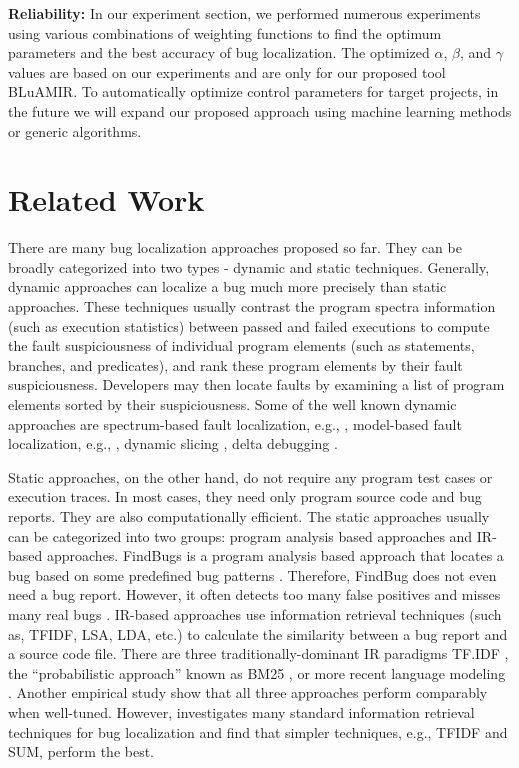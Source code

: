 \documentclass[conference]{IEEEtran}
\begin{document}
\textbf{Reliability:}
In our experiment section, we performed numerous experiments using various combinations of weighting functions to find the optimum parameters and the best accuracy of bug localization. The optimized $\alpha$, $\beta$, and $\gamma$ values are based on our experiments and are only for our proposed tool BLuAMIR. To automatically optimize control parameters for target projects, in the future we will expand our proposed approach using machine learning methods or generic algorithms.

\section{Related Work}\label{relatedwork}
There are many bug localization approaches proposed so far. They can be broadly categorized into two types - dynamic and static techniques. Generally, dynamic approaches can localize a bug much more precisely than static approaches. These techniques usually contrast the program spectra information (such as execution statistics) between passed and failed executions to compute the fault suspiciousness of individual program elements (such as statements, branches, and predicates), and rank these program elements by their fault suspiciousness. Developers may then locate faults by examining a list of program elements sorted by their suspiciousness. Some of the well known dynamic approaches are spectrum-based fault localization, e.g., \cite{Abreu,Jones,Lucia,SahaFault}, model-based fault localization, e.g., \cite{Feldman,Mayer}, dynamic slicing \cite{Zhang:2005}, delta debugging \cite{Zeller:2002}. 

Static approaches, on the other hand, do not require any program test cases or execution traces. In most cases, they need only program source code and bug reports. They are also computationally efficient. The static approaches usually can be categorized into two groups: program analysis based approaches and IR-based approaches. FindBugs is a program analysis based approach that locates a bug based on some predefined bug patterns \cite{FindBug}. Therefore, FindBug does not even need a bug report. However, it often detects too many false positives and misses many real bugs \cite{Tang}. IR-based approaches use information retrieval techniques (such as, TFIDF, LSA, LDA, etc.) to calculate the similarity between a bug report and a source code file. There are three traditionally-dominant IR paradigms TF.IDF \cite{Salton}, the “probabilistic approach” known as BM25 \cite{Robertson}, or more recent language modeling \cite{Ponte}. Another empirical study \cite{Fang} show that all three approaches perform comparably when well-tuned. However, \citet{Rao} investigates many standard information retrieval techniques for bug localization and find that simpler techniques, e.g., TFIDF and SUM, perform the best. 
\end{document}
